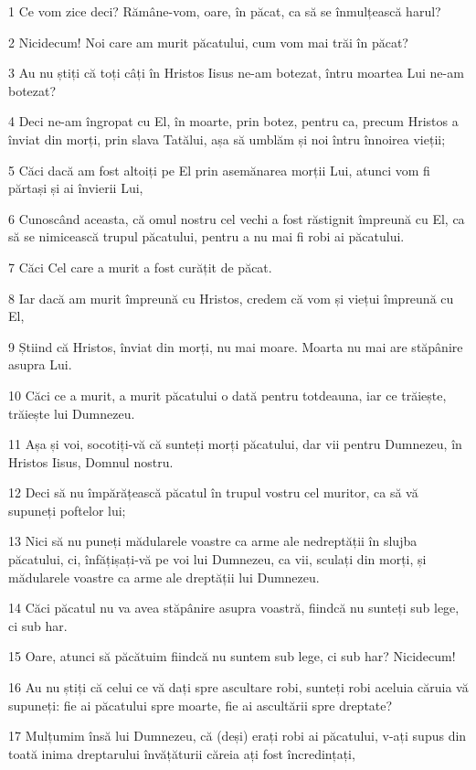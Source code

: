 \par 1 Ce vom zice deci? Rămâne-vom, oare, în păcat, ca să se înmulțească harul?
\par 2 Nicidecum! Noi care am murit păcatului, cum vom mai trăi în păcat?
\par 3 Au nu știți că toți câți în Hristos Iisus ne-am botezat, întru moartea Lui ne-am botezat?
\par 4 Deci ne-am îngropat cu El, în moarte, prin botez, pentru ca, precum Hristos a înviat din morți, prin slava Tatălui, așa să umblăm și noi întru înnoirea vieții;
\par 5 Căci dacă am fost altoiți pe El prin asemănarea morții Lui, atunci vom fi părtași și ai învierii Lui,
\par 6 Cunoscând aceasta, că omul nostru cel vechi a fost răstignit împreună cu El, ca să se nimicească trupul păcatului, pentru a nu mai fi robi ai păcatului.
\par 7 Căci Cel care a murit a fost curățit de păcat.
\par 8 Iar dacă am murit împreună cu Hristos, credem că vom și viețui împreună cu El,
\par 9 Știind că Hristos, înviat din morți, nu mai moare. Moarta nu mai are stăpânire asupra Lui.
\par 10 Căci ce a murit, a murit păcatului o dată pentru totdeauna, iar ce trăiește, trăiește lui Dumnezeu.
\par 11 Așa și voi, socotiți-vă că sunteți morți păcatului, dar vii pentru Dumnezeu, în Hristos Iisus, Domnul nostru.
\par 12 Deci să nu împărățească păcatul în trupul vostru cel muritor, ca să vă supuneți poftelor lui;
\par 13 Nici să nu puneți mădularele voastre ca arme ale nedreptății în slujba păcatului, ci, înfățișați-vă pe voi lui Dumnezeu, ca vii, sculați din morți, și mădularele voastre ca arme ale dreptății lui Dumnezeu.
\par 14 Căci păcatul nu va avea stăpânire asupra voastră, fiindcă nu sunteți sub lege, ci sub har.
\par 15 Oare, atunci să păcătuim fiindcă nu suntem sub lege, ci sub har? Nicidecum!
\par 16 Au nu știți că celui ce vă dați spre ascultare robi, sunteți robi aceluia căruia vă supuneți: fie ai păcatului spre moarte, fie ai ascultării spre dreptate?
\par 17 Mulțumim însă lui Dumnezeu, că (deși) erați robi ai păcatului, v-ați supus din toată inima dreptarului învățăturii căreia ați fost încredințați,
